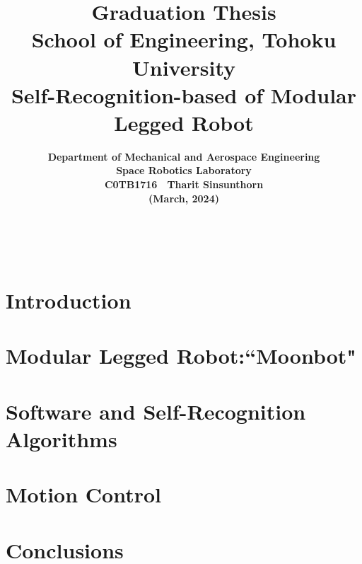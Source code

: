 \documentclass[a4paper,12pt]{./include/ethesis_gen} %
\title{ \vspace{-30mm}
{\Large \bf Graduation Thesis} \\
{\Large \bf School of Engineering, Tohoku University} \\
\vspace{20mm}
{\Huge \bf Self-Recognition-based of Modular Legged Robot} \\
\vspace{60mm}
}
\author{
{\Large \bf Department of Mechanical and Aerospace Engineering}\\
{\Large \bf Space Robotics Laboratory}\vspace{25mm}\\
{\LARGE \bf C0TB1716　Tharit Sinsunthorn}\\
{\Large \bf (March, 2024)} \vspace{10mm}}
\date{}
\begin{document}
\maketitle
\thispagestyle{empty}
~~\newpage

\pagestyle{myheadings}

\thispagestyle{myheadings}


\pagestyle{headings}
\setcounter{page}{1}%
\tableofcontents
\listoftables
\listoffigures

\pagestyle{headings}
\chapter{Introduction}
\setcounter{page}{1} %
\label{cha:intro}


\chapter{Modular Legged Robot:``Moonbot"}


\chapter{Software and Self-Recognition Algorithms}


\chapter{Motion Control}


\chapter{Conclusions}



\cleardoublepage %

\end{document}
